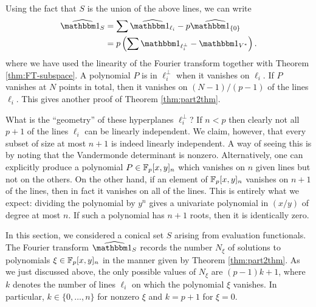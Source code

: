 Using the fact that $S$ is the union of the above lines, we can write
\begin{align*}
	\widehat{\IND_S} &= \sum \widehat{\IND_{\ell_i}} - p\widehat{\IND_{\{0\}}} \\
	&= p\left(\sum \IND_{\ell_i^\bot} - \IND_{V^*}\right).
\end{align*}
where we have used the linearity of the Fourier transform together with Theorem \ref{thm:FT-subspace}. A polynomial $P$ is in $\ell_i^\bot$ when it vanishes on $\ell_i$. If $P$ vanishes at $N$ points in total, then it vanishes on $(N - 1)/(p-1)$ of the lines $\ell_i$. This gives another proof of Theorem \ref{thm:part2thm}.

What is the ``geometry'' of these hyperplanes $\ell_i^\bot$? If $n < p$ then clearly not all $p+1$ of the lines $\ell_i$ can be linearly independent. We claim, however, that every subset of size at most $n+1$ is indeed linearly independent. A way of seeing this is by noting that the Vandermonde determinant is nonzero. Alternatively, one can explicitly produce a polynomial $P \in \mathbb{F}_p[x,y]_n$ which vanishes on $n$ given lines but not on the others. On the other hand, if an element of $\mathbb{F}_p[x,y]_n$ vanishes on $n+1$ of the lines, then in fact it vanishes on all of the lines. This is entirely what we expect: dividing the polynomial by $y^n$ gives a univariate polynomial in $(x/y)$ of degree at most $n$. If such a polynomial has $n+1$ roots, then it is identically zero.

In this section, we considered a conical set $S$ arising from evaluation functionals. The Fourier transform $\widehat{\IND_S}$ records the number $N_\xi$ of solutions to polynomials $\xi\in\mathbb{F}_p[x,y]_n$ in the manner given by Theorem \ref{thm:part2thm}. As we just discussed above, the only possible values of $N_\xi$ are $(p-1)k + 1$, where $k$ denotes the number of lines $\ell_i$ on which the polynomial $\xi$ vanishes. In particular, $k\in\{0,\ldots,n\}$ for nonzero $\xi$ and $k=p+1$ for $\xi = 0$.